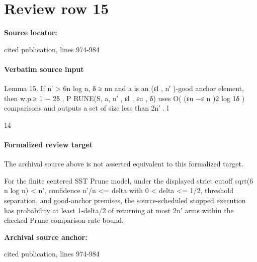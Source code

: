 \documentclass[10pt]{article}
\begin{document}
\section*{Review row 15}
\textbf{Source locator:} {\footnotesize\raggedright cited publication, lines 974-\allowbreak{}984\par}
\paragraph{Verbatim source input}
\begin{ReviewVerbatim}
Lemma 15. If n′ > 6n log n, δ ≥ nn and a is an (εl , n′ )-good anchor element, then w.p.≥ 1 − 2δ ,
P RUNE(S, a, n′ , εl , εu , δ) uses O( (εu −ε
                                           n
                                              )2
                                                 log 1δ ) comparisons and outputs a set of size less than 2n′ .
                                           l




                                                            14
\end{ReviewVerbatim}


\paragraph{Formalized review target}
The archival source above is not asserted equivalent to this formalized target.
\begin{ReviewVerbatim}
For the finite centered SST Prune model, under the displayed strict cutoff sqrt(6 n log n) < n', confidence n'/n <= delta with 0 < delta <= 1/2, threshold separation, and good-anchor premises, the source-scheduled stopped execution has probability at least 1-delta/2 of returning at most 2n' arms within the checked Prune comparison-rate bound.
\end{ReviewVerbatim}

\textbf{Archival source anchor:} {\footnotesize\raggedright cited publication, lines 974-\allowbreak{}984\par}
\end{document}
